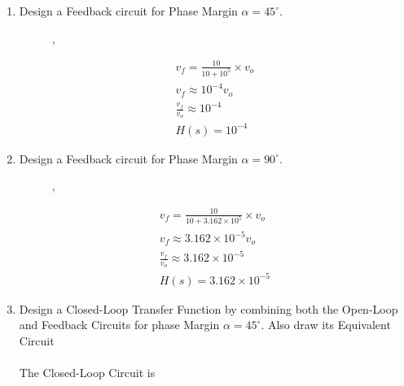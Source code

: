 \begin{enumerate}[label=\thesection.\arabic*.,ref=\thesection.\theenumi]
\item Design a Feedback circuit for Phase Margin $\alpha=45^{\circ}$.\\
\solution
\begin{figure}[ht!]
	\begin{center}
		\resizebox{\columnwidth/2}{!}{}
	\end{center},
	\caption{}
	\label{fig:ee18btech11014_alpha=45}
\end{figure}
\begin{align}
v_{f} = \frac{10}{10 + 10^{5}} \times v_{o}\\
v_{f} \approx 10^{-4} v_{o}\\
\frac{v_{f}}{v_{o}} \approx 10^{-4}\\
H(s) = 10^{-4}
\end{align}

\item Design a Feedback circuit for Phase Margin $\alpha=90^{\circ}$.\\
\solution
\begin{figure}[ht!]
	\begin{center}
		\resizebox{\columnwidth/2}{!}{}
	\end{center},
	\caption{}
	\label{fig:ee18btech11014_alpha=90}
\end{figure}
\begin{align}
v_{f} = \frac{10}{10 + 3.162\times 10^{5}} \times v_{o}\\
v_{f} \approx 3.162\times 10^{-5} v_{o}\\
\frac{v_{f}}{v_{o}} \approx 3.162\times 10^{-5}\\
H(s) = 3.162\times 10^{-5}
\end{align}

\item  Design a Closed-Loop Transfer Function by combining both the Open-Loop and Feedback Circuits for phase Margin $\alpha=45^{\circ}$. Also draw its Equivalent Circuit\\
\solution\\
The Closed-Loop Circuit is
\begin{figure}[ht!]
	\begin{center}
		\resizebox{\columnwidth}{!}{}
	\end{center}
	\caption{}
	\label{fig:ee18btech11014_Closed-Loop Circuit alpha=45}
\end{figure}


\end{enumerate}
